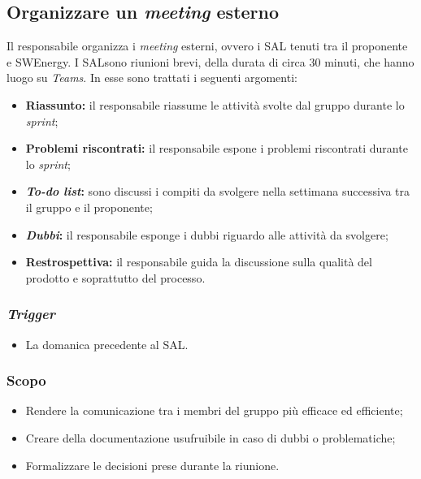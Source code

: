 \subsection{Organizzare un \textit{meeting} esterno}
\label{organizzare-meeting-esterno}

Il responsabile organizza i \textit{meeting} esterni, ovvero i SAL\g
tenuti tra il proponente e SWEnergy.
I SAL\g sono riunioni brevi, della durata di circa 30 minuti, che hanno
luogo su \textit{Teams}. In esse
sono trattati i seguenti argomenti:
\begin{itemize}
	\item \textbf{Riassunto:} il responsabile riassume le attività svolte dal
	      gruppo durante lo \textit{sprint};

	\item \textbf{Problemi riscontrati:} il responsabile espone i problemi
	      riscontrati durante lo \textit{sprint};

	\item \textbf{\textit{To-do list}:} sono discussi i compiti da svolgere nella
	      settimana successiva tra il gruppo e il proponente;

	\item \textbf{\textit{Dubbi}:} il responsabile esponge i dubbi riguardo alle
	      attività da svolgere;

	\item \textbf{Restrospettiva:} il responsabile guida la discussione sulla
	      qualità del prodotto e soprattutto del processo.
\end{itemize}

\subsubsection{\textit{Trigger}}
\begin{itemize}
	\item La domanica precedente al SAL\g.
\end{itemize}

\subsubsection{Scopo}
\begin{itemize}
	\item Rendere la comunicazione tra i membri del gruppo più efficace ed
	      efficiente;

	\item Creare della documentazione usufruibile in caso di dubbi o
	      problematiche;

	\item Formalizzare le decisioni prese durante la riunione.
\end{itemize}

